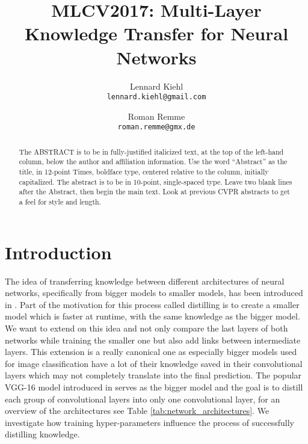 \documentclass[10pt,twocolumn,letterpaper]{article}
\begin{document}
\title{MLCV2017: Multi-Layer Knowledge Transfer for Neural Networks}

\author{Lennard Kiehl\\
{\tt\small lennard.kiehl@gmail.com}
\and
Roman Remme\\
{\tt\small roman.remme@gmx.de}
}

\maketitle

\begin{abstract}
   The ABSTRACT is to be in fully-justified italicized text, at the top
   of the left-hand column, below the author and affiliation
   information. Use the word ``Abstract'' as the title, in 12-point
   Times, boldface type, centered relative to the column, initially
   capitalized. The abstract is to be in 10-point, single-spaced type.
   Leave two blank lines after the Abstract, then begin the main text.
   Look at previous CVPR abstracts to get a feel for style and length.
\end{abstract}

\section{Introduction}

The idea of transferring knowledge between different architectures of neural networks, specifically from bigger models to smaller models, has been introduced in \cite{hinton2015distilling}. Part of the motivation for this process called distilling is to create a smaller model which is faster at runtime, with the same knowledge as the bigger model. We want to extend on this idea and not only compare the last layers of both networks while training the smaller one but also add links between intermediate layers. This extension is a really canonical one as especially bigger models used for image classification have a lot of their knowledge saved in their convolutional layers which may not completely translate into the final prediction. The popular VGG-16 model introduced in \cite{DBLP:journals/corr/SimonyanZ14a} serves as the bigger model and the goal is to distill each group of convolutional layers into only one convolutional layer, for an overview of the architectures see Table \ref{tab:network_architectures}. We investigate how training hyper-parameters influence the process of successfully distilling knowledge.
\end{document}
